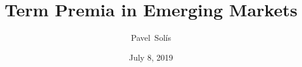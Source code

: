 
\title[]{Term Premia in Emerging Markets}
\author[]{Pavel~Solís}
\date[]{July 8, 2019}

\frame{\titlepage}
